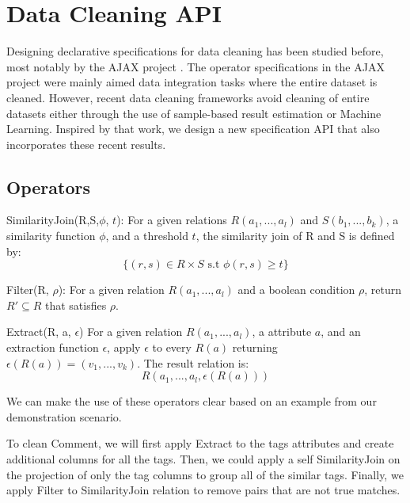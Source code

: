  \section{Data Cleaning API}
Designing declarative specifications for data cleaning has been studied before, most notably by the AJAX project \cite{DBLP:conf/vldb/GalhardasFSSS01}.
The operator specifications in the AJAX project were mainly aimed data integration tasks where the entire dataset is cleaned.
However, recent data cleaning frameworks avoid cleaning of entire datasets either through the use of sample-based result estimation or Machine Learning.
Inspired by that work, we design a new specification API that also incorporates these recent results.

\subsection{Operators}

\vspace{0.5em}

\noindent \textsf{SimilarityJoin(R,S,$\phi$, $t$)}: For a given relations $R(a_1,...,a_l)$ and $S(b_1,...,b_k)$, a similarity function $\phi$, and a threshold $t$, the similarity join of R and S is defined by:
\[
\{ (r,s) \in R \times S \text{ s.t } \phi (r,s) \ge t \}
\]

\vspace{0.5em}


\noindent \textsf{Filter(R, $\rho$)}: For a given relation $R(a_1,...,a_l)$ and a boolean condition $\rho$, return $R' \subseteq R$ that satisfies $\rho$.

\vspace{0.5em}

\noindent \textsf{Extract(R, a, $\epsilon$)} For a given relation $R(a_1,...,a_l)$, a attribute $a$, and an extraction function $\epsilon$, apply $\epsilon$ to every $R(a)$ returning $\epsilon(R(a)) = (v_1,...,v_k)$. The result relation is:
\[
R(a_1,...,a_l,\epsilon(R(a)))
\]

We can make the use of these operators clear based on an example from
our demonstration scenario.
\begin{example}
To clean \textsf{Comment}, we will first apply \textsf{Extract} to the \textsf{tags}
attributes and create additional columns for all the tags.
Then, we could apply a self \textsf{SimilarityJoin} on the projection of only the tag columns 
to group all of the similar tags.
Finally, we apply \textsf{Filter} to \textsf{SimilarityJoin} relation to remove pairs that
are not true matches.
\end{example}

